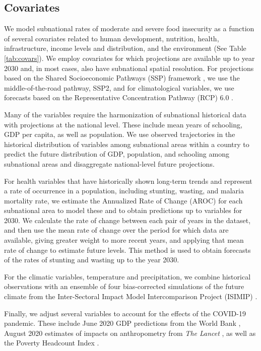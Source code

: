 \documentclass{article}
\begin{document}
\subsection{Covariates}
We model subnational rates of moderate and severe food insecurity as a function of several covariates related to human development, nutrition, health, infrastructure, income levels and distribution, and the environment (See Table \ref{tab:covars}).  We employ covariates for which projections are available up to year 2030 and, in most cases, also have subnational spatial resolution.  For projections based on the Shared Socioeconomic Pathways (SSP) framework \citep{oneill2014new}, we use the middle-of-the-road pathway, SSP2, and for climatological variables, we use forecasts based on the Representative Concentration Pathway (RCP) 6.0 \citep{van2011representative}.  

Many of the variables require the harmonization of subnational historical data with projections at the national level.  These include mean years of schooling, GDP per capita, as well as population. We use observed trajectories in the historical distribution of variables among subnational areas within a country to predict the future distribution of GDP, population, and schooling among subnational areas and disaggregate national-level future projections.

For health variables that have historically shown long-term trends and represent a rate of occurrence in a population, including stunting, wasting, and malaria mortality rate, we estimate the Annualized Rate of Change (AROC) for each subnational area to model these and to obtain predictions up to variables for 2030. We calculate the rate of change between each pair of years in the dataset, and then use the mean rate of change over the period for which data are available, giving greater weight to more recent years, and applying that mean rate of change to estimate future levels.  This method is used to obtain forecasts of the rates of stunting and wasting up to the year 2030.

For the climatic variables, temperature and precipitation, we combine historical observations with an ensemble of four bias-corrected simulations of the future climate from the Inter-Sectoral Impact Model Intercomparison Project (ISIMIP) \citep{warszawski2014inter}.

Finally, we adjust several variables to account for the effects of the COVID-19 pandemic.  These include June 2020 GDP predictions from the World Bank \citep{prospects2020}, August 2020 estimates of impacts on anthropometry from \textit{The Lancet} \citep{headey2020impacts}, as well as the Poverty Headcount Index \cite{Cuaresma2018}.
\end{document}
